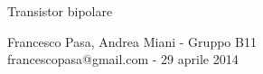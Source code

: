 \documentclass[11pt, twoside, a4paper]{article}
\begin{document}
\begin{center}

        {\huge Transistor bipolare}
    \vspace{0.1cm}

      	{Francesco Pasa, Andrea Miani - Gruppo B11} \\
      	{francescopasa@gmail.com - 29 aprile 2014}
    \vspace{-0.2cm}

\end{center}





\end{document}
